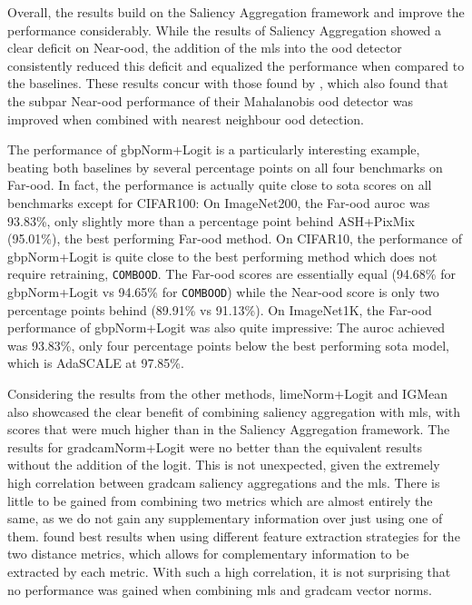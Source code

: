 \documentclass[UKenglish]{uiomasterthesis} %
\theoremstyle{definition}
\begin{document}
Overall, the results build on the Saliency Aggregation framework and improve the performance considerably. While the results of Saliency Aggregation showed a clear deficit on Near-\ac{ood}, the addition of the \ac{mls} into the \ac{ood} detector consistently reduced this deficit and equalized the performance when compared to the baselines. These results concur with those found by \cite{combood}, which also found that the subpar Near-\ac{ood} performance of their Mahalanobis \ac{ood} detector was improved when combined with nearest neighbour \ac{ood} detection.

The performance of \ac{gbp}Norm+Logit is a particularly interesting example, beating both baselines by several percentage points on all four benchmarks on Far-\ac{ood}. In fact, the performance is actually quite close to \ac{sota} scores on all benchmarks except for CIFAR100: On ImageNet200, the Far-\ac{ood} \ac{auroc} was 93.83\%, only slightly more than a percentage point behind ASH+PixMix (95.01\%), the best performing Far-\ac{ood} method. On CIFAR10, the performance of \ac{gbp}Norm+Logit is quite close to the best performing method which does not require retraining, \texttt{COMBOOD}. The Far-\ac{ood} scores are essentially equal (94.68\% for \ac{gbp}Norm+Logit vs 94.65\% for \texttt{COMBOOD}) while the Near-\ac{ood} score is only two percentage points behind (89.91\% vs 91.13\%). On ImageNet1K, the Far-\ac{ood} performance of \ac{gbp}Norm+Logit was also quite impressive: The \ac{auroc} achieved was 93.83\%, only four percentage points below the best performing \ac{sota} model, which is AdaSCALE \cite{adascale} at 97.85\%.

Considering the results from the other methods, \ac{lime}Norm+Logit and IGMean also showcased the clear benefit of combining saliency aggregation with \ac{mls}, with scores that were much higher than in the Saliency Aggregation framework. The results for \ac{gradcam}Norm+Logit were no better than the equivalent results without the addition of the logit. This is not unexpected, given the extremely high correlation between \ac{gradcam} saliency aggregations and the \ac{mls}. There is little to be gained from combining two metrics which are almost entirely the same, as we do not gain any supplementary information over just using one of them. \cite{combood} found best results when using different feature extraction strategies for the two distance metrics, which allows for complementary information to be extracted by each metric. With such a high correlation, it is not surprising that no performance was gained when combining \ac{mls} and \ac{gradcam} vector norms.
\end{document}

